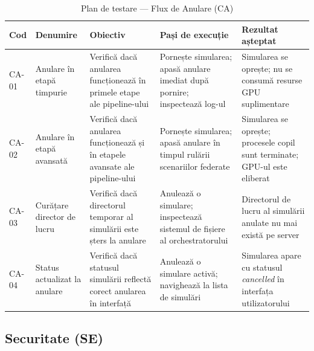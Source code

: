 \documentclass[../../main.tex]{subfiles}
\begin{document}
    \begin{table}[H]
        \centering
        \footnotesize
        \begin{tabular}{|p{}|p{}|p{}|p{}|p{}|}
            \hline
            \textbf{Cod} & \textbf{Denumire} & \textbf{Obiectiv} & \textbf{Pași de execuție} & \textbf{Rezultat așteptat} \\
            \hline
            CA-01 & Anulare în etapă timpurie & Verifică dacă anularea funcționează în primele etape ale pipeline-ului & Pornește simularea; apasă anulare imediat după pornire; inspectează log-ul & Simularea se oprește; nu se consumă resurse GPU suplimentare \\
            \hline
            CA-02 & Anulare în etapă avansată & Verifică dacă anularea funcționează și în etapele avansate ale pipeline-ului & Pornește simularea; apasă anulare în timpul rulării scenariilor federate & Simularea se oprește; procesele copil sunt terminate; GPU-ul este eliberat \\
            \hline
            CA-03 & Curățare director de lucru & Verifică dacă directorul temporar al simulării este șters la anulare & Anulează o simulare; inspectează sistemul de fișiere al orchestratorului & Directorul de lucru al simulării anulate nu mai există pe server \\
            \hline
            CA-04 & Status actualizat la anulare & Verifică dacă statusul simulării reflectă corect anularea în interfață & Anulează o simulare activă; navighează la lista de simulări & Simularea apare cu statusul \textit{cancelled} în interfața utilizatorului \\
            \hline
        \end{tabular}
        \caption{Plan de testare --- Flux de Anulare (CA)}
        \label{tab:test_ca}
    \end{table}

    \subsection{Securitate (SE)}
\end{document}

